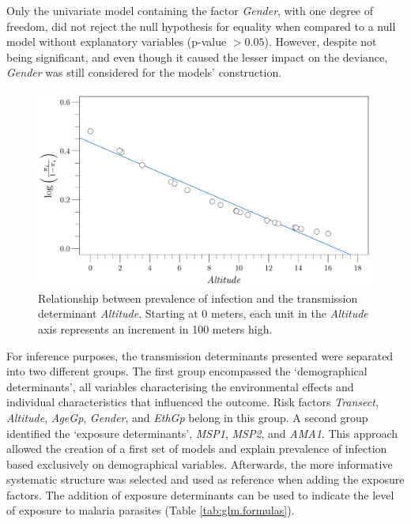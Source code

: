 Only the univariate model containing the factor \textit{Gender}, with one degree of freedom, did not reject the null hypothesis for equality when compared to a null model without explanatory variables (p-value $>0.05$).
However, despite not being significant, and even though it caused the lesser impact on the deviance, \textit{Gender} was still considered for the models' construction.

\newpage

\begin{figure}[H]
\center
\begin{adjustbox}{width=14cm}
\includegraphics{images/altitude.pdf}
\end{adjustbox}
\caption[Relationship between transmission determinant \textit{Altitude} and respective log odds]{Relationship between prevalence of infection and the transmission determinant \textit{Altitude}. Starting at 0 meters, each unit in the \textit{Altitude} axis represents an increment in 100 meters high.}
\label{fig:altitude_curve}
\end{figure}

For inference purposes, the transmission determinants presented were separated into two different groups.
The first group encompassed the `demographical determinants', all variables characterising the environmental effects and individual characteristics that influenced the outcome.
Risk factors \textit{Transect}, \textit{Altitude}, \textit{AgeGp}, \textit{Gender}, and \textit{EthGp} belong in this group.
A second group identified the `exposure determinants', \textit{MSP1}, \textit{MSP2}, and \textit{AMA1}.
This approach allowed the creation of a first set of models and explain prevalence of infection based exclusively on demographical variables.
Afterwards, the more informative systematic structure was selected and used as reference when adding the exposure factors.
The addition of exposure determinants can be used to indicate the level of exposure to malaria parasites (Table \ref{tab:glm.formulas}).

